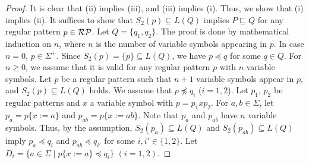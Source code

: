 \begin{proof}
    It is clear that (ii) implies (iii), and (iii) implies (i).
    Thus, we show that (i) implies (ii).
    It suffices to show that $S_{2}(p) \subseteq L(Q)$ implies $P \sqsubseteq Q$
    for any regular pattern $p \in \mathcal{RP}$.
    Let $Q = \{q_{1}, q_{2}\}$.
    The proof is done by mathematical induction on $n$,
    where $n$ is the number of variable symbols appearing in $p$.
    In case $n=0$, $p \in \Sigma^{+}$.
    Since $S_{2}(p) = \{p\} \subseteq L(Q)$, we have $p \preceq q$
    for some $q \in Q$.
    For $n \geq 0$, we assume that it is valid for any regular pattern $p$ with
    $n$ variable symbols.
    Let $p$ be a regular pattern such that $n+1$ variable symbols appear in $p$,
    and $S_{2}(p) \subseteq L(Q)$ holds.
    We assume that $p \not\preceq q_{i}$ ($i=1,2$).
    Let $p_{1}$, $p_{2}$ be regular patterns and $x$ a variable symbol
    with $p = p_{1}xp_{2}$.
    For $a, b \in \Sigma$,
    let $p_{a} = p\{x:=a\}$ and $p_{ab} = p\{x:=ab\}$.
    Note that $p_{a}$ and $p_{ab}$ have $n$ variable symbols.
    Thus, by the assumption,
    $S_{2}(p_{a}) \subseteq L(Q)$ and $S_{2}(p_{ab}) \subseteq L(Q)$
    imply $p_{a} \preceq q_{i}$ and $p_{ab} \preceq q_{i'}$ for some
    $i, i' \in \{1,2\}$.
    Let $D_{i} = \{a \in \Sigma \mid p\{x:=a\} \preceq q_{i}\}$ $(i=1,2)$.

\end{proof}
